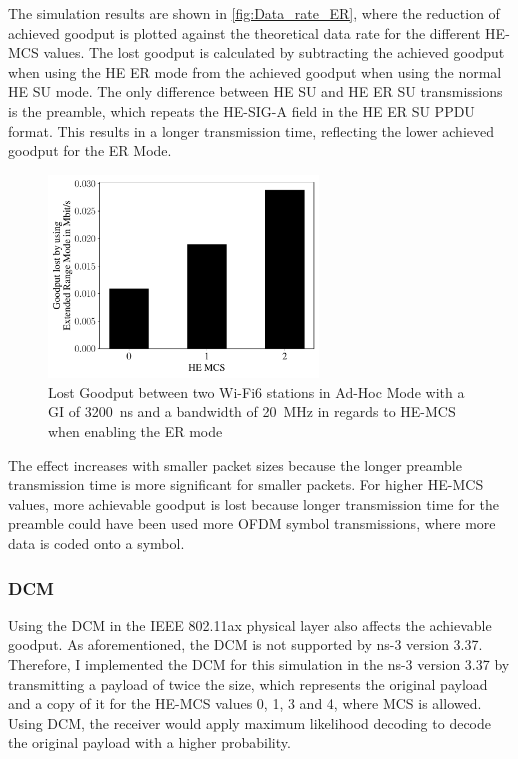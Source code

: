 The simulation results are shown in \autoref{fig:Data_rate_ER}, where the reduction of achieved goodput is plotted against the theoretical data rate for the different \ac{HE}-\ac{MCS} values.
The lost goodput is calculated by subtracting the achieved goodput when using the \ac{HE} \ac{ER} mode from the achieved goodput when using the normal \ac{HE} SU mode.
The only difference between \ac{HE} SU and \ac{HE} \ac{ER} SU transmissions is the preamble, which repeats the \ac{HE}-SIG-A field in the \ac{HE} \ac{ER} SU \ac{PPDU} format.
This results in a longer transmission time, reflecting the lower achieved goodput for the \ac{ER} Mode.
\begin{figure}[H]%
   \centering
   \includegraphics[width=0.64\textwidth]{figures/ER_dataRate_simulation.pdf}
   \caption{Lost Goodput between two Wi-Fi6 stations in Ad-Hoc Mode with a
   \acf{GI} of \SI{3200}{\nano\second} and a bandwidth of \SI{20}{\mega\hertz} in regards to \acf{HE}-\acf{MCS} when enabling the \ac{ER} mode}%
   \label{fig:Data_rate_ER}%
\end{figure}
The effect increases with smaller packet sizes because the longer preamble transmission time is more significant for smaller packets.
For higher \ac{HE}-\ac{MCS} values, more achievable goodput is lost because longer transmission time for the preamble could have
been used more \ac{OFDM} symbol transmissions, where more data is coded onto a symbol.

\subsubsection*{\acf{DCM}}
Using the \ac{DCM} in the IEEE 802.11ax physical layer also affects the achievable goodput.
As aforementioned, the \ac{DCM} is not supported by ns-3 version 3.37.
Therefore, I implemented the \ac{DCM} for this simulation in the ns-3 version 3.37 by transmitting a payload of twice the size, which represents the original payload and a
copy of it for the \ac{HE}-\ac{MCS} values 0, 1, 3 and 4, where \ac{MCS} is allowed.
Using \ac{DCM}, the receiver would apply maximum likelihood decoding to decode the original payload with a higher probability.

